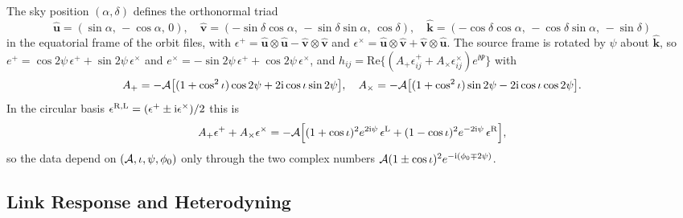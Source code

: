 The sky position $(\alpha,\delta)$ defines the orthonormal triad
\begin{equation}
  \hat{\mathbf u} = (\sin\alpha,\,-\cos\alpha,\,0),\quad
  \hat{\mathbf v} = (-\sin\delta\cos\alpha,\,-\sin\delta\sin\alpha,\,\cos\delta),\quad
  \hat{\mathbf k} = (-\cos\delta\cos\alpha,\,-\cos\delta\sin\alpha,\,-\sin\delta)
  \label{eq:forward-model-triad}
\end{equation}
in the equatorial frame of the orbit files, with $\epsilon^+ = \hat{\mathbf u}\otimes\hat{\mathbf u} -
\hat{\mathbf v}\otimes\hat{\mathbf v}$ and $\epsilon^\times = \hat{\mathbf u}\otimes\hat{\mathbf v} +
\hat{\mathbf v}\otimes\hat{\mathbf u}$. The source frame is rotated by $\psi$ about $\hat{\mathbf k}$, so
$e^+ = \cos2\psi\,\epsilon^+ + \sin2\psi\,\epsilon^\times$ and
$e^\times = -\sin2\psi\,\epsilon^+ + \cos2\psi\,\epsilon^\times$, and
$h_{ij} = \mathrm{Re}\bigl\{(A_+\epsilon^+_{ij} + A_\times\epsilon^\times_{ij})e^{\ii\Psi}\bigr\}$ with
\begin{equation}
  A_+ = -\mathcal{A}\bigl[(1+\cos^2\iota)\cos2\psi + 2\mathrm{i}\cos\iota\sin2\psi\bigr],\quad
  A_\times = -\mathcal{A}\bigl[(1+\cos^2\iota)\sin2\psi - 2\mathrm{i}\cos\iota\cos2\psi\bigr].
  \label{eq:forward-model-complex-amp}
\end{equation}
In the circular basis $\epsilon^{\rm R,L} = (\epsilon^+ \pm \mathrm{i}\epsilon^\times)/2$ this is
\begin{equation}
  A_+\epsilon^+ + A_\times\epsilon^\times
  = -\mathcal{A}\Bigl[(1+\cos\iota)^2 e^{2\mathrm{i}\psi}\,\epsilon^{\rm L} + (1-\cos\iota)^2 e^{-2\mathrm{i}\psi}\,\epsilon^{\rm R}\Bigr],
  \label{eq:forward-model-helicity}
\end{equation}
so the data depend on $(\mathcal{A},\iota,\psi,\phi_0)$ only through the two complex numbers
$\mathcal{A}(1\pm\cos\iota)^2e^{-\mathrm{i}(\phi_0\mp2\psi)}$.

\subsection{Link Response and Heterodyning}
\label{app:forward-model-link}\label{app:forward-model-heterodyne}


